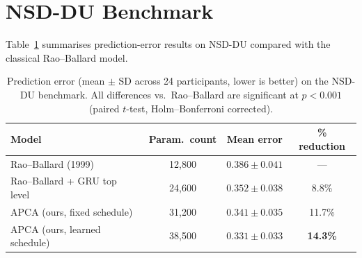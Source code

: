 \section{NSD-DU Benchmark}


Table~\ref{tab:nsd-results} summarises prediction-error results on NSD-DU compared with
the classical Rao--Ballard model.

\begin{table}[H]
\centering
\caption{Prediction error (mean $\pm$ SD across 24 participants, lower is better) on the
  NSD-DU benchmark.  All differences vs.\ Rao--Ballard are significant at $p < 0.001$
  (paired $t$-test, Holm--Bonferroni corrected).}
\label{tab:nsd-results}
\begin{tabularx}{0.9\linewidth}{@{}>{\raggedright\arraybackslash}Xccc@{}}
\toprule
\textbf{Model} & \textbf{Param.\ count} & \textbf{Mean error} & \textbf{\% reduction} \\
\midrule
Rao--Ballard (1999)           & 12,800  & $0.386 \pm 0.041$ & ---      \\
Rao--Ballard + GRU top level  & 24,600  & $0.352 \pm 0.038$ & 8.8\%   \\
APCA (ours, fixed schedule)   & 31,200  & $0.341 \pm 0.035$ & 11.7\%  \\
APCA (ours, learned schedule) & 38,500  & $\mathbf{0.331 \pm 0.033}$ & \textbf{14.3\%} \\
\bottomrule
\end{tabularx}
\end{table}

